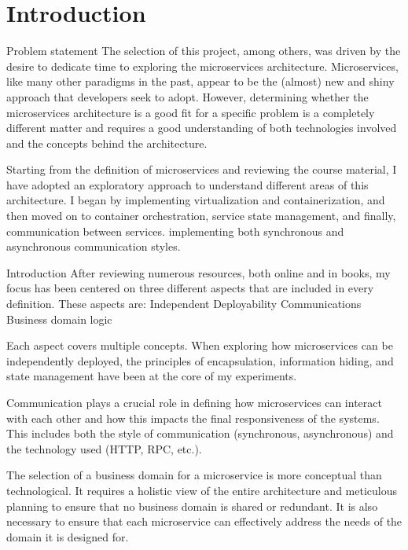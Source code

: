 \documentclass[sigplan,screen]{acmart}
\begin{document}

\maketitle

\section{Introduction}

Problem statement
The selection of this project, among others, was driven by the desire to dedicate time to exploring the microservices architecture. Microservices, like many other paradigms in the past, appear to be the (almost) new and shiny approach that developers seek to adopt. However, determining whether the microservices architecture is a good fit for a specific problem is a completely different matter and requires a good understanding of both technologies involved and the concepts behind the architecture.

Starting from the definition of microservices and reviewing the course material, I have adopted an exploratory approach to understand different areas of this architecture. I began by implementing virtualization and containerization, and then moved on to container orchestration, service state management, and finally, communication between services. implementing both synchronous and asynchronous communication styles.

Introduction
After reviewing numerous resources, both online and in books, my focus has been centered on three different aspects that are included in every definition. These aspects are:
Independent Deployability
Communications 
Business domain logic

Each aspect covers multiple concepts. When exploring how microservices can be independently deployed, the principles of encapsulation, information hiding, and state management have been at the core of my experiments.

Communication plays a crucial role in defining how microservices can interact with each other and how this impacts the final responsiveness of the systems. This includes both the style of communication (synchronous, asynchronous) and the technology used (HTTP, RPC, etc.).

The selection of a business domain for a microservice is more conceptual than technological. It requires a holistic view of the entire architecture and meticulous planning to ensure that no business domain is shared or redundant. It is also necessary to ensure that each microservice can effectively address the needs of the domain it is designed for.
\end{document}
